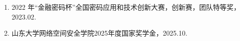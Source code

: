 
\awards

\begin{enumerate}
    \item 2022 年“金融密码杯”全国密码应用和技术创新大赛，创新赛，团队特等奖，2023.02. 
    \item 山东大学网络空间安全学院2025年度国家奖学金，2025.10.

\end{enumerate}